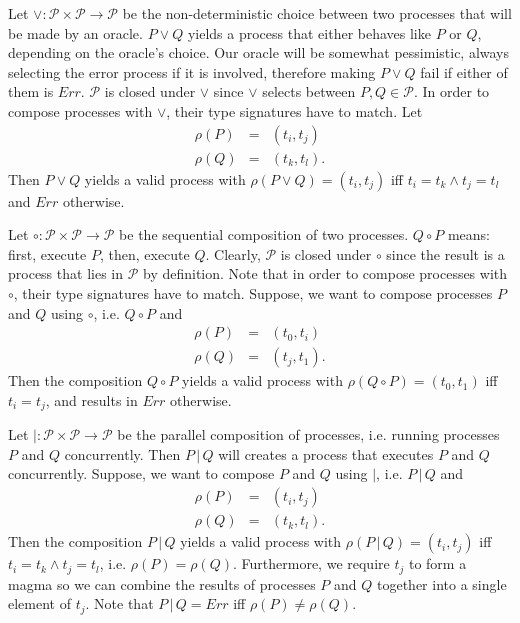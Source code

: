 Let $\vee \colon \mathcal{P} \times \mathcal{P} \to \mathcal{P}$ be the non-deterministic choice between two processes that will be made by an oracle. $P \vee Q$ yields a process that either behaves like $P$ or $Q$, depending on the oracle's choice. Our oracle will be somewhat pessimistic, always selecting the error process if it is involved, therefore making $P \vee Q$ fail if either of them is $Err$. $\mathcal{P}$ is closed under $\vee$ since $\vee$ selects between $P, Q \in \mathcal{P}$. In order to compose processes with $\vee$, their type signatures have to match. Let
\begin{eqnarray*}
  \rho \left( P \right) & = & \left( t_i, t_j \right) \\
  \rho \left( Q \right) & = & \left( t_k, t_l \right).
\end{eqnarray*}
Then $P \vee Q$ yields a valid process with $\rho \left( P \vee Q \right) = \left( t_i, t_j \right)$ iff $t_i = t_k \wedge t_j = t_l$ and $Err$ otherwise. 

Let $\circ \colon \mathcal{P} \times \mathcal{P} \to \mathcal{P}$ be the sequential composition of two processes. $Q \circ P$ means: first, execute $P$, then, execute $Q$. Clearly, $\mathcal{P}$ is closed under $\circ$ since the result is a process that lies in $\mathcal{P}$ by definition. Note that in order to compose processes with $\circ$, their type signatures have to match. Suppose, we want to compose processes $P$ and $Q$ using $\circ$, i.e. $Q \circ P$ and
\begin{eqnarray*}
  \rho \left( P \right) & = & \left( t_0, t_i \right) \\
  \rho \left( Q \right) & = & \left( t_j, t_1 \right).
\end{eqnarray*}
Then the composition $Q \circ P$ yields a valid process with $\rho \left( Q \circ P \right) = \left( t_0, t_1 \right)$ iff $t_i = t_j$, and results in $Err$ otherwise. 

Let $| \colon \mathcal{P} \times \mathcal{P} \to \mathcal{P}$ be the parallel composition of processes, i.e. running processes $P$ and $Q$ concurrently. Then $P \,|\, Q$ will creates a process that executes $P$ and $Q$ concurrently. Suppose, we want to compose $P$ and $Q$ using $|$, i.e. $P \,|\, Q$ and
\begin{eqnarray*}
  \rho \left( P \right) & = & \left( t_i, t_j \right) \\
  \rho \left( Q \right) & = & \left( t_k, t_l \right).
\end{eqnarray*}
Then the composition $P \,|\, Q$ yields a valid process with $\rho \left( P \,|\, Q \right) = \left( t_i, t_j \right)$ iff $t_i = t_k \wedge t_j = t_l$, i.e. $\rho \left( P \right) = \rho \left( Q \right)$. Furthermore, we require $t_j$ to form a magma so we can combine the results of processes $P$ and $Q$ together into a single element of $t_j$. Note that $P \,|\, Q = Err$ iff $\rho \left( P \right) \neq \rho \left( Q \right)$.

